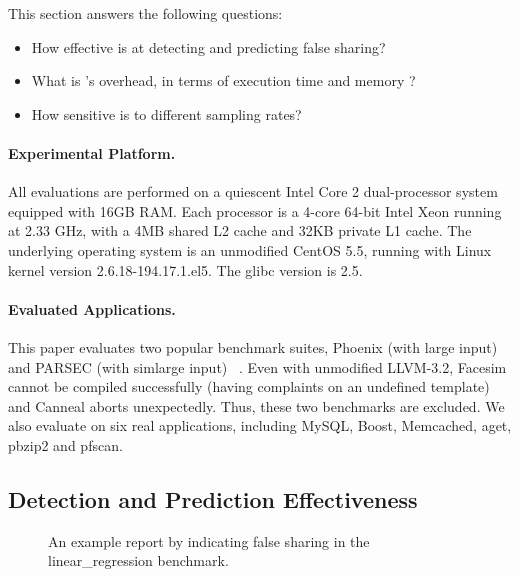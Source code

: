 


\label{sec:evaluation}

This section answers the following questions:
\begin{itemize}
\item
  How effective is \Predator{} at detecting and predicting false sharing?

\item
  What is \Predator{}'s overhead, in terms of execution time and memory ?

\item
  How sensitive is \Predator{} to different sampling rates?
 
\end{itemize}

\paragraph{Experimental Platform.} All evaluations are performed on a quiescent Intel Core 2 dual-processor system equipped with 
16GB RAM. Each processor is a 4-core 64-bit Intel Xeon running at 2.33 GHz, with a 4MB shared L2 cache and 32KB private L1 cache. The underlying operating system is an unmodified CentOS 5.5, running with Linux kernel version 2.6.18-194.17.1.el5. The glibc version is 2.5. 

\paragraph{Evaluated Applications.}
This paper evaluates two popular benchmark suites,
Phoenix (with large input) ~\cite{phoenix-hpca} and PARSEC (with simlarge input) ~\cite{parsec}. Even with unmodified LLVM-3.2, Facesim cannot be compiled successfully (having complaints on an undefined template) and Canneal aborts unexpectedly. Thus, these two benchmarks are excluded.
We also evaluate \Predator{} on six real applications, including MySQL, Boost, Memcached, aget, pbzip2 and pfscan.



\subsection{Detection and Prediction Effectiveness}
\label{sec:effective}

\begin{figure}[htb]
{\centering
\tiny
\subfigure{}
\caption{An example report by \Predator{} indicating false sharing in the linear\_regression benchmark.
\label{fig:lrreport}}
}
\end{figure}

